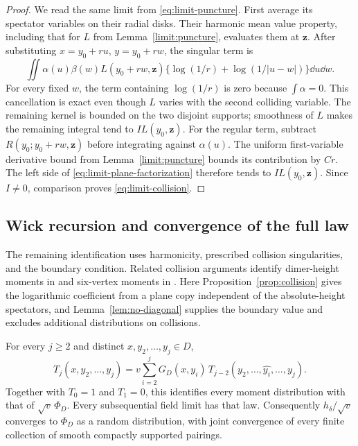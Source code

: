 \begin{proof}
We read the same limit from \eqref{eq:limit-puncture}.
First average its spectator variables on their radial disks.
Their harmonic mean value property, including that for \(L\)
from Lemma~\ref{limit:puncture}, evaluates them at \(\mathbf z\).
After substituting \(x=y_0+ru\), \(y=y_0+rw\), the singular term is
\[
 \iint\alpha(u)\beta(w)L(y_0+rw,\mathbf z)
       \{\log(1/r)+\log(1/|u-w|)\}\dd u\dd w .
\]
For every fixed \(w\), the term containing \(\log(1/r)\) is zero
because \(\int\alpha=0\).  This cancellation is exact even though
\(L\) varies with the second colliding variable.
The remaining kernel is bounded on the two disjoint supports;
smoothness of \(L\) makes the remaining integral tend to
\(I L(y_0,\mathbf z)\).
For the regular term, subtract
\(R(y_0;y_0+rw,\mathbf z)\) before integrating against \(\alpha(u)\).
The uniform first-variable derivative bound from
Lemma~\ref{limit:puncture} bounds its contribution by \(Cr\).
The left side of \eqref{eq:limit-plane-factorization} therefore
tends to \(I L(y_0,\mathbf z)\).
Since \(I\ne0\), comparison proves \eqref{eq:limit-collision}.
\end{proof}

\subsection{Wick recursion and convergence of the full law}

The remaining identification uses harmonicity, prescribed collision
singularities, and the boundary condition.  Related collision arguments
identify dimer-height moments in \cite[Section~3]{Kenyon2001} and
six-vertex moments in \cite[Section~7.2]{DCKLM2026}.
Here Proposition~\ref{prop:collision} gives the logarithmic coefficient
from a plane copy independent of the absolute-height spectators, and
Lemma~\ref{lem:no-diagonal} supplies the boundary value and excludes
additional distributions on collisions.

\begin{theorem}
\label{thm:wick}
For every \(j\ge2\) and distinct \(x,y_2,\ldots,y_j\in D\),
\begin{equation}
 T_j(x,y_2,\ldots,y_j)
   =v\sum_{i=2}^j G_D(x,y_i)\,
          T_{j-2}(y_2,\ldots,\widehat{y_i},\ldots,y_j).
 \label{eq:limit-wick}
\end{equation}
Together with \(T_0=1\) and \(T_1=0\), this identifies every moment
distribution with that of \(\sqrt v\,\Phi_D\).
Every subsequential field limit has that law.  Consequently
\(h_\delta/\sqrt v\) converges to \(\Phi_D\) as a random
distribution, with joint convergence of every finite collection of
smooth compactly supported pairings.
\end{theorem}

